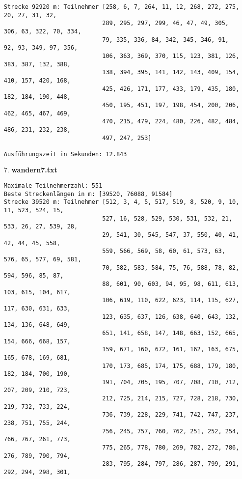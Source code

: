 \documentclass[a4paper,10pt,ngerman]{scrartcl}
\begin{document}
\begin{itemize}
\begin{verbatim}
Strecke 92920 m: Teilnehmer [258, 6, 7, 264, 11, 12, 268, 272, 275, 20, 27, 31, 32, 
                            289, 295, 297, 299, 46, 47, 49, 305, 306, 63, 322, 70, 334, 
                            79, 335, 336, 84, 342, 345, 346, 91, 92, 93, 349, 97, 356, 
                            106, 363, 369, 370, 115, 123, 381, 126, 383, 387, 132, 388, 
                            138, 394, 395, 141, 142, 143, 409, 154, 410, 157, 420, 168, 
                            425, 426, 171, 177, 433, 179, 435, 180, 182, 184, 190, 448, 
                            450, 195, 451, 197, 198, 454, 200, 206, 462, 465, 467, 469, 
                            470, 215, 479, 224, 480, 226, 482, 484, 486, 231, 232, 238, 
                            497, 247, 253]

Ausführungszeit in Sekunden: 12.843
  \end{verbatim}
  \item [7.] \textbf{wandern7.txt}
  \begin{verbatim}
Maximale Teilnehmerzahl: 551
Beste Streckenlängen in m: [39520, 76088, 91584]
Strecke 39520 m: Teilnehmer [512, 3, 4, 5, 517, 519, 8, 520, 9, 10, 11, 523, 524, 15, 
                            527, 16, 528, 529, 530, 531, 532, 21, 533, 26, 27, 539, 28, 
                            29, 541, 30, 545, 547, 37, 550, 40, 41, 42, 44, 45, 558, 
                            559, 566, 569, 58, 60, 61, 573, 63, 576, 65, 577, 69, 581, 
                            70, 582, 583, 584, 75, 76, 588, 78, 82, 594, 596, 85, 87, 
                            88, 601, 90, 603, 94, 95, 98, 611, 613, 103, 615, 104, 617, 
                            106, 619, 110, 622, 623, 114, 115, 627, 117, 630, 631, 633, 
                            123, 635, 637, 126, 638, 640, 643, 132, 134, 136, 648, 649, 
                            651, 141, 658, 147, 148, 663, 152, 665, 154, 666, 668, 157, 
                            159, 671, 160, 672, 161, 162, 163, 675, 165, 678, 169, 681, 
                            170, 173, 685, 174, 175, 688, 179, 180, 182, 184, 700, 190, 
                            191, 704, 705, 195, 707, 708, 710, 712, 207, 209, 210, 723, 
                            212, 725, 214, 215, 727, 728, 218, 730, 219, 732, 733, 224, 
                            736, 739, 228, 229, 741, 742, 747, 237, 238, 751, 755, 244, 
                            756, 245, 757, 760, 762, 251, 252, 254, 766, 767, 261, 773, 
                            775, 265, 778, 780, 269, 782, 272, 786, 276, 789, 790, 794, 
                            283, 795, 284, 797, 286, 287, 799, 291, 292, 294, 298, 301, 

\end{verbatim}
\end{itemize}
\end{document}
